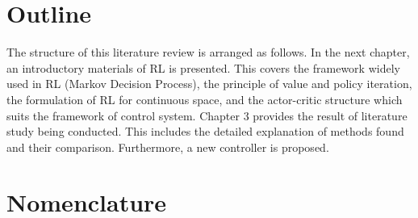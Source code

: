 \section{Outline}

The structure of this literature review is arranged as follows. In the next chapter, an introductory materials of \ac{RL} is presented. This covers the framework widely used in \ac{RL} (Markov Decision Process), the principle of value and policy iteration, the formulation of \ac{RL} for continuous space, and the actor-critic structure which suits the framework of control system. Chapter 3 provides the result of literature study being conducted. This includes the detailed explanation of methods found and their comparison. Furthermore, a new controller is proposed. 

\section{Nomenclature}


